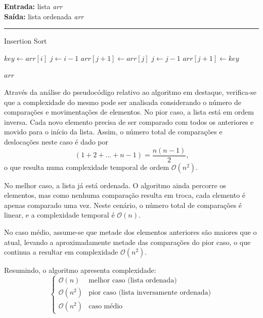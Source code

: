 \documentclass[conference]{IEEEtran}
\begin{document}
\begin{algorithm}[H]
    \raggedright
    \vspace{.1em}
    \textbf{Entrada:} lista \textit{arr} \\
    \textbf{Saída:} lista ordenada \textit{arr} \\
    \vspace{.5em}
    \hrule 
    \caption{Insertion Sort}
    \begin{algorithmic}[1]
            \State $key \gets arr[i]$
            \State $j \gets i - 1$
                \State $arr[j + 1] \gets arr[j]$
                \State $j \gets j - 1$
            \EndWhile
            \State $arr[j + 1] \gets key$
        \EndFor
    
        \State \Return $arr$
    \end{algorithmic}
\end{algorithm}

Através da análise do pseudocódigo relativo ao algoritmo em destaque, verifica-se que a complexidade do mesmo pode ser analisada considerando o número de comparações e movimentações de elementos. No pior caso, a lista está em ordem inversa. Cada novo elemento precisa de ser comparado com todos os anteriores e movido para o início da lista. Assim, o número total de comparações e deslocações neste caso é dado por
$$
(1 + 2 + \ldots + n-1) = \frac{n(n-1)}{2} \text{,}
$$
o que resulta numa complexidade temporal de ordem \(\mathcal{O}(n^2)\).

No melhor caso, a lista já está ordenada. O algoritmo ainda percorre os elementos, mas como nenhuma comparação resulta em troca, cada elemento é apenas comparado uma vez. Neste cenário, o número total de comparações é linear, e a complexidade temporal é \(\mathcal{O}(n)\).

No caso médio, assume-se que metade dos elementos anteriores são maiores que o atual, levando a aproximadamente metade das comparações do pior caso, o que continua a resultar em complexidade \(\mathcal{O}(n^2)\).

Resumindo, o algoritmo apresenta complexidade:
\[
\begin{cases}
\mathcal{O}(n) & \text{melhor caso (lista ordenada)} \\
\mathcal{O}(n^2) & \text{pior caso (lista inversamente ordenada)} \\
\mathcal{O}(n^2) & \text{caso médio}
\end{cases}
\]
\end{document}
